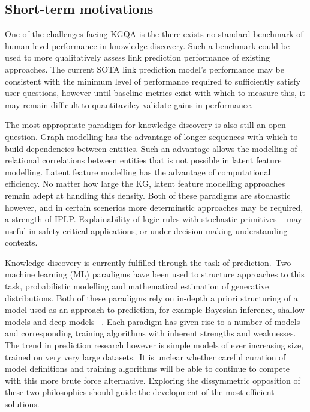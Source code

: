 \subsection{Short-term motivations}

One of the challenges facing KGQA is the there exists no standard benchmark of human-level performance in knowledge discovery. Such a benchmark could be used to more qualitatively assess link prediction performance of existing approaches. The current SOTA link prediction model's performance may be consistent with the minimum level of performance required to sufficiently satisfy user questions, however until baseline metrics exist with which to measure this, it may remain difficult to quantitaviley validate gains in performance. \par

\noindent The most appropriate paradigm for knowledge discovery is also still an open question. Graph modelling has the advantage of longer sequences with which to build dependencies between entities. Such an advantage allows the modelling of relational correlations between entities that is not possible in latent feature modelling. Latent feature modelling has the advantage of computational efficiency. No matter how large the KG, latent feature modelling approaches remain adept at handling this density. Both of these paradigms are stochastic however, and in certain scenerios more determinstic approaches may be required, a strength of IPLP. Explainability of logic rules with stochastic primitives \unskip~\citep{yang2017differentiable} may useful in safety-critical applications, or under decision-making understanding contexts. \par

\noindent Knowledge discovery is currently fulfilled through the task of prediction.\ Two machine learning (ML) paradigms have been used to structure approaches to this task, probabilistic modelling and mathematical estimation of generative distributions. Both of these paradigms rely on in-depth a priori structuring of a model used as an approach to prediction, for example Bayesian inference, shallow models and deep models \unskip~\citep{murphy2012machine}. Each paradigm has given rise to a number of models and corresponding training algorithms with inherent strengths and weaknesses. The trend in prediction research however is simple models of ever increasing size, trained on very very large datasets.\ It is unclear whether careful curation of model definitions and training algorithms will be able to continue to compete with this more brute force alternative. Exploring the dissymmetric opposition of these two philosophies should guide the development of the most efficient solutions.

